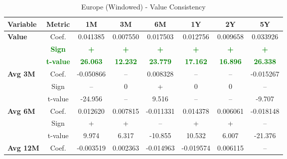 \documentclass[11pt,english,a4paper,hidelinks]{book}
\begin{document}
\begin{table}[H]
    \centering
    \caption{Europe (Windowed) - Value Consistency}
    \begin{tabular}{lccccccc}
        \toprule
        \textbf{Variable} & \textbf{Metric} & \textbf{1M} & \textbf{3M} & \textbf{6M} & \textbf{1Y} & \textbf{2Y} & \textbf{5Y} \\
        \midrule
        \multirow{3}{*}{\textbf{Value}}
            & Coef.   & 0.041385  & 0.007550  & 0.017503  & 0.012756  & 0.009658  & 0.033926  \\
            & \textbf{\textcolor{green}{Sign}}
                     & \textbf{\textcolor{green}{+}}
                     & \textbf{\textcolor{green}{+}}
                     & \textbf{\textcolor{green}{+}}
                     & \textbf{\textcolor{green}{+}}
                     & \textbf{\textcolor{green}{+}}
                     & \textbf{\textcolor{green}{+}} \\
            & \textbf{\textcolor{green}{t-value}}
                     & \textbf{\textcolor{green}{26.063}}
                     & \textbf{\textcolor{green}{12.232}}
                     & \textbf{\textcolor{green}{23.779}}
                     & \textbf{\textcolor{green}{17.162}}
                     & \textbf{\textcolor{green}{16.896}}
                     & \textbf{\textcolor{green}{26.338}} \\
        \cmidrule{1-8}
        \multirow{3}{*}{\textbf{Avg 3M}}
            & Coef.   & -0.050866 & --        & 0.008328  & --        & --        & -0.015267 \\
            & Sign    & –         & 0         & +         & 0         & 0         & –         \\
            & t-value & -24.956   & --        & 9.516     & --        & --        & -9.707    \\
        \cmidrule{1-8}
        \multirow{3}{*}{\textbf{Avg 6M}}
            & Coef.   & 0.012620  & 0.007815  & -0.011331 & 0.014378  & 0.006061  & -0.018148 \\
            & Sign    & +         & +         & –         & +         & +         & –         \\
            & t-value & 9.974     & 6.317     & -10.855   & 10.532    & 6.007     & -21.376   \\
        \cmidrule{1-8}
        \multirow{3}{*}{\textbf{Avg 12M}}
            & Coef.   & -0.003519 & 0.002363  & -0.014963 & -0.019574 & 0.006115  & --        \\

\end{tabular}
\end{table}
\end{document}
